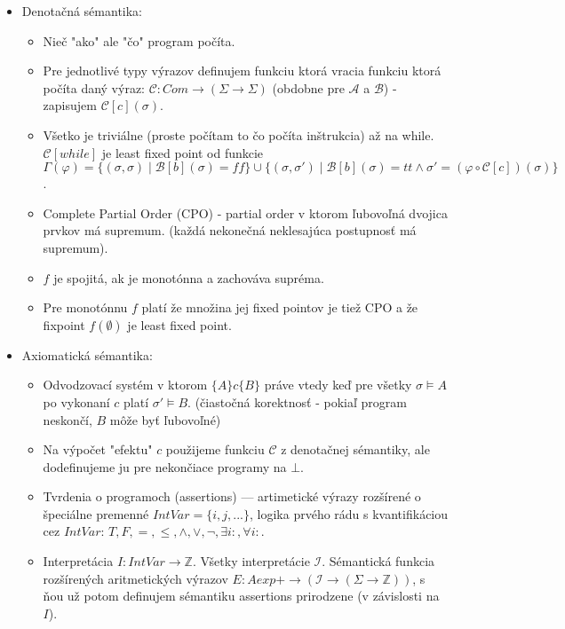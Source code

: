 \documentclass[paper=a4, fontsize=11pt]{scrartcl} %
\numberwithin{equation}{section} %
\numberwithin{figure}{section} %
\numberwithin{table}{section} %
\begin{document}
\begin{itemize}
		\item Denotačná sémantika:
		
		\begin{itemize}
			\item Nieč "ako" ale "čo" program počíta.
			\item Pre jednotlivé typy výrazov definujem funkciu ktorá vracia funkciu ktorá počíta daný výraz: $\mathcal{C}: Com \to (\Sigma \to \Sigma)$ (obdobne pre $\mathcal{A}$ a $\mathcal{B}$) - zapisujem $\mathcal{C}[c](\sigma)$.
			\item Všetko je triviálne (proste počítam to čo počíta inštrukcia) až na while. $\mathcal{C}[while]$ je least fixed point od funkcie $\Gamma(\varphi) = \{(\sigma, \sigma) \mid \mathcal{B}[b](\sigma) = ff \} \cup \{ (\sigma, \sigma') \mid \mathcal{B}[b](\sigma) = tt \land \sigma' = (\varphi \circ \mathcal{C}[c])(\sigma) \}$. 
			\item Complete Partial Order (CPO) - partial order v ktorom ľubovoľná dvojica prvkov má supremum. (každá nekonečná neklesajúca postupnosť má supremum).
			\item $f$ je spojitá, ak je monotónna a zachováva supréma.
			\item Pre monotónnu $f$ platí že množina jej fixed pointov je tiež CPO a že fixpoint $f(\emptyset)$ je least fixed point.
		\end{itemize}
	
		\item Axiomatická sémantika:
		
		\begin{itemize}
			\item Odvodzovací systém v ktorom $\{A\} c \{B\}$ práve vtedy keď pre všetky $\sigma \models A$ po vykonaní $c$ platí $\sigma' \models B$. (čiastočná korektnosť - pokiaľ program neskončí, $B$ môže byť ľubovoľné)
			
			\item Na výpočet "efektu" $c$ použijeme funkciu $\mathcal{C}$ z denotačnej sémantiky, ale dodefinujeme ju pre nekončiace programy na $\bot$.
			
			\item Tvrdenia o programoch (assertions) — artimetické výrazy rozšírené o špeciálne premenné $IntVar = \{i,j, ...\}$, logika prvého rádu s kvantifikáciou cez $IntVar$: $T, F, =, \leq, \land, \lor, \neg, \exists i : , \forall i : $.
			
			\item Interpretácia $I : IntVar \to \mathbb{Z}$. Všetky interpretácie $\mathcal{I}$. Sémantická funkcia rozšírených aritmetických výrazov $E : Aexp+ \to (\mathcal{I} \to (\Sigma \to \mathbb{Z}))$, s ňou už potom definujem sémantiku assertions prirodzene (v závislosti na $I$).
			

\end{itemize}
\end{itemize}
\end{document}
